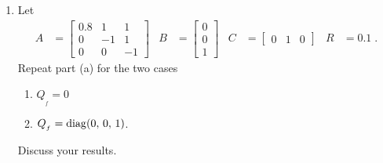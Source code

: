 \begin{enumerate}

\item
Let
\begin{align*}
    A & = \begin{bmatrix}
            0.8 & 1 & 1 \\
            0 & -1 & 1 \\
            0 & 0 & -1
        \end{bmatrix}
        & B & = \begin{bmatrix}
            0 \\
            0 \\
            1
        \end{bmatrix}
        & C & = \begin{bmatrix}
            0 & 1 & 0
        \end{bmatrix}
        & R & = 0.1 \; .
\end{align*}
Repeat part (a) for the two cases

\begin{enumerate}
    \item $Q_{_f} = 0$
    \item $Q_{_f} = {\rm diag}(0,\,0,\,1)$.
\end{enumerate}
Discuss your results.

\end{enumerate}


